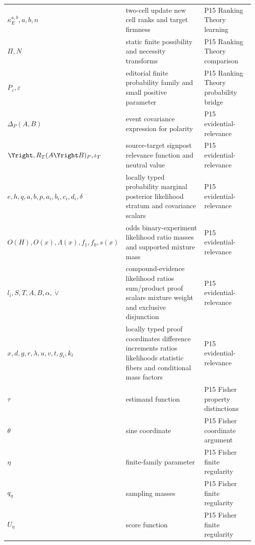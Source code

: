 \begin{longtable}{@{}p{}p{}p{}@{}}
\(\kappa_E^{a,b},\allowbreak a,\allowbreak b,\allowbreak n\) & two-cell update new cell ranks and target firmness & P15 Ranking Theory learning \\
\(\Pi,\allowbreak N\) & static finite possibility and necessity transforms & P15 Ranking Theory comparison \\
\(P_\varepsilon,\allowbreak \varepsilon\) & editorial finite probability family and small positive parameter & P15 Ranking Theory probability bridge \\
\(\Delta_P(A,\allowbreak B)\) & event covariance expression for polarity & P15 evidential-\allowbreak{}relevance \\
\(\Yright,\allowbreak R_T(A\Yright B)_P,\allowbreak \iota_T\) & source-target signpost relevance function and neutral value & P15 evidential-\allowbreak{}relevance \\
\(e,\allowbreak h,\allowbreak q,\allowbreak a,\allowbreak b,\allowbreak p,\allowbreak a_i,\allowbreak b_i,\allowbreak c_i,\allowbreak d_i,\allowbreak \delta\) & locally typed probability marginal posterior likelihood stratum and covariance scalars & P15 evidential-\allowbreak{}relevance \\
\(O(H),\allowbreak O(x),\allowbreak \Lambda(x),\allowbreak f_1,\allowbreak f_0,\allowbreak s(x)\) & odds binary-experiment likelihood ratio masses and supported mixture mass & P15 evidential-\allowbreak{}relevance \\
\(l_i,\allowbreak S,\allowbreak T,\allowbreak A,\allowbreak B,\allowbreak \alpha,\allowbreak \dot\vee\) & compound-evidence likelihood ratios sum/product proof scalars mixture weight and exclusive disjunction & P15 evidential-\allowbreak{}relevance \\
\(x,\allowbreak d,\allowbreak g,\allowbreak r,\allowbreak \lambda,\allowbreak u,\allowbreak v,\allowbreak t,\allowbreak g_i,\allowbreak k_t\) & locally typed proof coordinates difference increments ratios likelihoods statistic fibers and conditional mass factors & P15 evidential-\allowbreak{}relevance \\
\(\tau\) & estimand function & P15 Fisher property distinctions \\
\(\theta\) & sine coordinate & P15 Fisher coordinate argument \\
\(\eta\) & finite-family parameter & P15 Fisher finite regularity \\
\(q_\eta\) & sampling masses & P15 Fisher finite regularity \\
\(U_\eta\) & score function & P15 Fisher finite regularity \\

\end{longtable}
